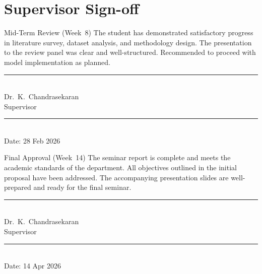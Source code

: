 \section{Supervisor Sign-off}

\vspace{4pt}
\begin{signoffblock}{Mid-Term Review (Week~8)}
\noindent The student has demonstrated satisfactory progress in literature survey, dataset analysis, and methodology design. The presentation to the review panel was clear and well-structured. Recommended to proceed with model implementation as planned.

\vspace{16pt}
\noindent
\begin{minipage}[t]{0.45\textwidth}
  \centering
  \rule{0.8\textwidth}{0.4pt}\\[4pt]
  {\small\color{graytext} Dr.\ K.\ Chandrasekaran}\\[2pt]
  {\footnotesize\color{graytext} Supervisor}
\end{minipage}
\hfill
\begin{minipage}[t]{0.45\textwidth}
  \centering
  \rule{0.8\textwidth}{0.4pt}\\[4pt]
  {\small\color{graytext} Date: 28 Feb 2026}
\end{minipage}
\end{signoffblock}

\vspace{4pt}
\begin{signoffblock}{Final Approval (Week~14)}
\noindent The seminar report is complete and meets the academic standards of the department. All objectives outlined in the initial proposal have been addressed. The accompanying presentation slides are well-prepared and ready for the final seminar.

\vspace{16pt}
\noindent
\begin{minipage}[t]{0.45\textwidth}
  \centering
  \rule{0.8\textwidth}{0.4pt}\\[4pt]
  {\small\color{graytext} Dr.\ K.\ Chandrasekaran}\\[2pt]
  {\footnotesize\color{graytext} Supervisor}
\end{minipage}
\hfill
\begin{minipage}[t]{0.45\textwidth}
  \centering
  \rule{0.8\textwidth}{0.4pt}\\[4pt]
  {\small\color{graytext} Date: 14 Apr 2026}
\end{minipage}
\end{signoffblock}

